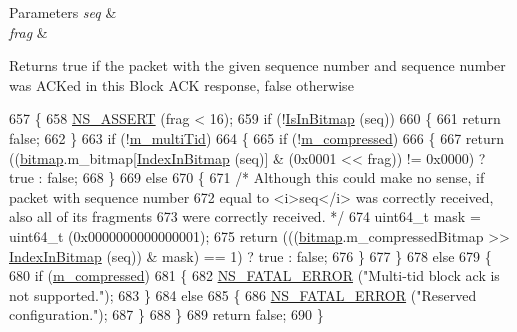 \begin{DoxyParams}{Parameters}
{\em seq} & \\
\hline
{\em frag} & \\
\hline
\end{DoxyParams}
\begin{DoxyReturn}{Returns}
true if the packet with the given sequence number and sequence number was A\+C\+Ked in this Block A\+CK response, false otherwise 
\end{DoxyReturn}

\begin{DoxyCode}
657 \{
658   \hyperlink{assert_8h_a6dccdb0de9b252f60088ce281c49d052}{NS\_ASSERT} (frag < 16);
659   \textcolor{keywordflow}{if} (!\hyperlink{classns3_1_1CtrlBAckResponseHeader_ab25d5b7f73ddb3c750365247ca8aa396}{IsInBitmap} (seq))
660     \{
661       \textcolor{keywordflow}{return} \textcolor{keyword}{false};
662     \}
663   \textcolor{keywordflow}{if} (!\hyperlink{classns3_1_1CtrlBAckResponseHeader_ab3b2b175ee54daa240e3cc0450c5812e}{m\_multiTid})
664     \{
665       \textcolor{keywordflow}{if} (!\hyperlink{classns3_1_1CtrlBAckResponseHeader_a7d33c0c452139f1d9f110dab89bfcef7}{m\_compressed})
666         \{
667           \textcolor{keywordflow}{return} ((\hyperlink{classns3_1_1CtrlBAckResponseHeader_a08f2ce2e8665317a7d381e498cc75453}{bitmap}.m\_bitmap[\hyperlink{classns3_1_1CtrlBAckResponseHeader_aa4c749e3ad38f8b22c9488d9af5053d2}{IndexInBitmap} (seq)] & (0x0001 << frag)) != 0x0000) ?
       \textcolor{keyword}{true} : \textcolor{keyword}{false};
668         \}
669       \textcolor{keywordflow}{else}
670         \{
671           \textcolor{comment}{/* Although this could make no sense, if packet with sequence number}
672 \textcolor{comment}{             equal to <i>seq</i> was correctly received, also all of its fragments}
673 \textcolor{comment}{             were correctly received. */}
674           uint64\_t mask = uint64\_t (0x0000000000000001);
675           \textcolor{keywordflow}{return} (((\hyperlink{classns3_1_1CtrlBAckResponseHeader_a08f2ce2e8665317a7d381e498cc75453}{bitmap}.m\_compressedBitmap >> \hyperlink{classns3_1_1CtrlBAckResponseHeader_aa4c749e3ad38f8b22c9488d9af5053d2}{IndexInBitmap} (seq)) & mask) == 1) ? \textcolor{keyword}{
      true} : \textcolor{keyword}{false};
676         \}
677     \}
678   \textcolor{keywordflow}{else}
679     \{
680       \textcolor{keywordflow}{if} (\hyperlink{classns3_1_1CtrlBAckResponseHeader_a7d33c0c452139f1d9f110dab89bfcef7}{m\_compressed})
681         \{
682           \hyperlink{group__fatal_ga5131d5e3f75d7d4cbfd706ac456fdc85}{NS\_FATAL\_ERROR} (\textcolor{stringliteral}{"Multi-tid block ack is not supported."});
683         \}
684       \textcolor{keywordflow}{else}
685         \{
686           \hyperlink{group__fatal_ga5131d5e3f75d7d4cbfd706ac456fdc85}{NS\_FATAL\_ERROR} (\textcolor{stringliteral}{"Reserved configuration."});
687         \}
688     \}
689   \textcolor{keywordflow}{return} \textcolor{keyword}{false};
690 \}
\end{DoxyCode}


